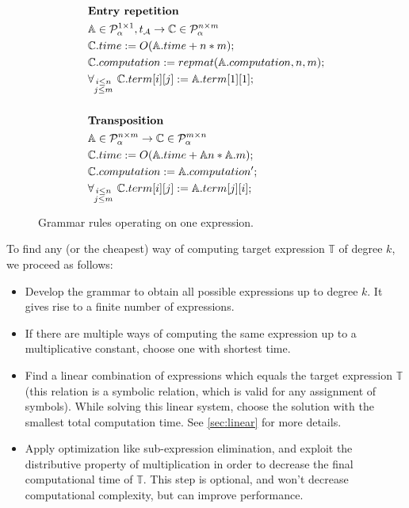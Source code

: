 \begin{figure}
\begin{framed}
\begin{align*}
& \\
&\text{{\bf Entry repetition}}\\
&\mathbb{A} \in \mathcal{P}^{1 \times 1}_\alpha, t_\mathcal{A} \rightarrow \mathbb{C} \in \mathcal{P}^{n \times m}_\alpha \\
&\mathbb{C}.time := O(\mathbb{A}.time + n * m);\\
&\mathbb{C}.computation := repmat(\mathbb{A}.computation, n, m); \\
&\forall_{\substack{i \leq n\\ j \leq m}}\text{ } \mathbb{C}.term[i][j] := \mathbb{A}.term[1][1];\\
& \\
&\text{{\bf Transposition}}\\
&\mathbb{A} \in \mathcal{P}^{n \times m}_\alpha \rightarrow \mathbb{C} \in \mathcal{P}^{m \times n}_\alpha\\
&\mathbb{C}.time := O(\mathbb{A}.time + \mathbb{A}n * \mathbb{A}.m);\\
&\mathbb{C}.computation := \mathbb{A}.computation';\\
&\forall_{\substack{i \leq n\\j \leq m}}\text{ } \mathbb{C}.term[i][j] := \mathbb{A}.term[j][i];
\end{align*}
\caption{Grammar rules operating on one expression.}
\label{fig:rules}
\end{framed}
\end{figure}


To find any (or the cheapest) way of computing target expression $\mathbb{T}$ of degree $k$, we proceed as follows: 
\begin{itemize}
\item Develop the grammar to obtain all possible expressions up to degree
  $k$. It gives rise to a finite number of expressions. 
\item If there are multiple ways of computing the same expression up
  to a multiplicative constant, choose one with shortest time.
\item Find a linear combination of expressions which equals the target
  expression $\mathbb{T}$ (this relation is a symbolic relation, which
  is valid for any assignment of symbols). While solving this linear
  system, choose the solution with the smallest total computation
  time. See \ref{sec:linear} for more details.
\item Apply optimization like sub-expression elimination, and exploit
  the distributive property of multiplication in order to decrease the
  final computational time of $\mathbb{T}$. This step is optional, and
  won't decrease computational complexity, but can improve
  performance.
\end{itemize}


